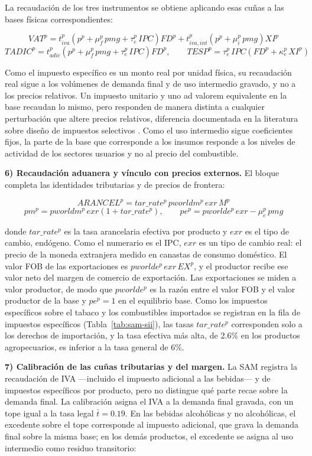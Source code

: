 \documentclass[11pt]{article}
\begin{document}
La recaudación de los tres instrumentos se obtiene aplicando esas cuñas a las bases físicas correspondientes:

\[
VAT^{p}=t_{iva}^{p}\left(p^{p}+\mu_{f}^{p}\,pmg+\tau_{e}^{p}\,IPC\right)FD^{p}+t_{iva,int}^{p}\left(p^{p}+\mu_{i}^{p}\,pmg\right)XI^{p}
\]
\[
TADIC^{p}=t_{adic}^{p}\left(p^{p}+\mu_{f}^{p}\,pmg+\tau_{e}^{p}\,IPC\right)FD^{p},
\qquad
TESP^{p}=\tau_{e}^{p}\,IPC\left(FD^{p}+\kappa_{e}^{p}\,XI^{p}\right)
\]

Como el impuesto específico es un monto real por unidad física, su recaudación real sigue a los volúmenes de demanda final y de uso intermedio gravado, y no a los precios relativos. Un impuesto unitario y uno ad valorem equivalente en la base recaudan lo mismo, pero responden de manera distinta a cualquier perturbación que altere precios relativos, diferencia documentada en la literatura sobre diseño de impuestos selectivos \cite{keen_1998,delipalla_keen_1992,cnossen_2005}. Como el uso intermedio sigue coeficientes fijos, la parte de la base que corresponde a los insumos responde a los niveles de actividad de los sectores usuarios y no al precio del combustible.

\textbf{6) Recaudación aduanera y vínculo con precios externos.} El bloque completa las identidades tributarias y de precios de frontera:

\[
ARANCEL^{p}=tar\_rate^{p}\,pworldm^{p}\,exr\,M^{p}
\]
\[
pm^{p}=pworldm^{p}\,exr\left(1+tar\_rate^{p}\right),
\qquad
pe^{p}=pworlde^{p}\,exr-\mu_{e}^{p}\,pmg
\]

donde $tar\_rate^{p}$ es la tasa arancelaria efectiva por producto y $exr$ es el tipo de cambio, endógeno. Como el numerario es el IPC, $exr$ es un tipo de cambio real: el precio de la moneda extranjera medido en canastas de consumo doméstico. El valor FOB de las exportaciones es $pworlde^{p}\,exr\,EX^{p}$, y el productor recibe ese valor neto del margen de comercio de exportación. Las exportaciones se miden a valor productor, de modo que $pworlde^{p}$ es la razón entre el valor FOB y el valor productor de la base y $pe^{p}=1$ en el equilibrio base. Como los impuestos específicos sobre el tabaco y los combustibles importados se registran en la fila de impuestos específicos (Tabla~\ref{tab:sam-sii}), las tasas $tar\_rate^{p}$ corresponden solo a los derechos de importación, y la tasa efectiva más alta, de 2.6\% en los productos agropecuarios, es inferior a la tasa general de 6\%.

\textbf{7) Calibración de las cuñas tributarias y del margen.} La SAM registra la recaudación de IVA ---incluido el impuesto adicional a las bebidas--- y de impuestos específicos por producto, pero no distingue qué parte recae sobre la demanda final. La calibración asigna el IVA a la demanda final gravada, con un tope igual a la tasa legal $\bar{t}=0.19$. En las bebidas alcohólicas y no alcohólicas, el excedente sobre el tope corresponde al impuesto adicional, que grava la demanda final sobre la misma base; en los demás productos, el excedente se asigna al uso intermedio como residuo transitorio:
\end{document}
